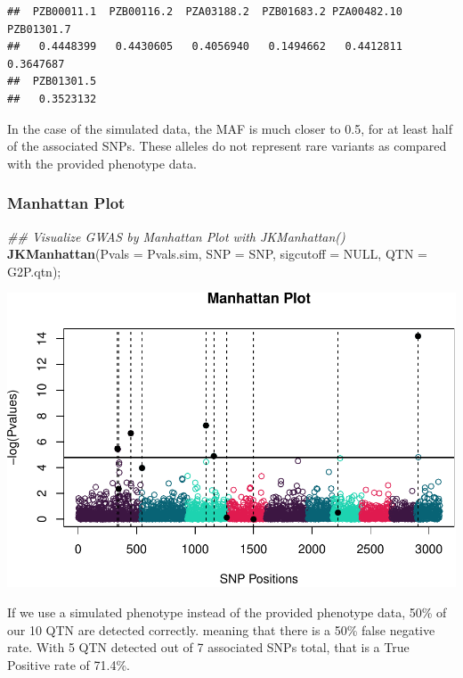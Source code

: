 \documentclass[
]{article}
\newenvironment{Shaded}{\begin{snugshade}}{\end{snugshade}}
\newcommand{\CommentTok}[1]{\textcolor[rgb]{0.56,0.35,0.01}{\textit{#1}}}
\newcommand{\DataTypeTok}[1]{\textcolor[rgb]{0.13,0.29,0.53}{#1}}
\newcommand{\KeywordTok}[1]{\textcolor[rgb]{0.13,0.29,0.53}{\textbf{#1}}}
\newcommand{\NormalTok}[1]{#1}
\newcommand{\OtherTok}[1]{\textcolor[rgb]{0.56,0.35,0.01}{#1}}
\begin{document}
\begin{verbatim}
##  PZB00011.1  PZB00116.2  PZA03188.2  PZB01683.2 PZA00482.10  PZB01301.7 
##   0.4448399   0.4430605   0.4056940   0.1494662   0.4412811   0.3647687 
##  PZB01301.5 
##   0.3523132
\end{verbatim}

In the case of the simulated data, the MAF is much closer to 0.5, for at
least half of the associated SNPs. These alleles do not represent rare
variants as compared with the provided phenotype data.

\hypertarget{manhattan-plot-1}{%
\subsubsection{Manhattan Plot}\label{manhattan-plot-1}}

\begin{Shaded}
\begin{Highlighting}[]
\CommentTok{\#\# Visualize GWAS by Manhattan Plot with JKManhattan()}
\KeywordTok{JKManhattan}\NormalTok{(}\DataTypeTok{Pvals =}\NormalTok{ Pvals.sim, }\DataTypeTok{SNP =}\NormalTok{ SNP, }\DataTypeTok{sigcutoff =} \OtherTok{NULL}\NormalTok{, }\DataTypeTok{QTN =}\NormalTok{ G2P.qtn);}
\end{Highlighting}
\end{Shaded}

\includegraphics{Homework4_JKGWAS_files/figure-latex/unnamed-chunk-13-1.pdf}

If we use a simulated phenotype instead of the provided phenotype data,
50\% of our 10 QTN are detected correctly. meaning that there is a 50\%
false negative rate. With 5 QTN detected out of 7 associated SNPs total,
that is a True Positive rate of 71.4\%.
\end{document}
